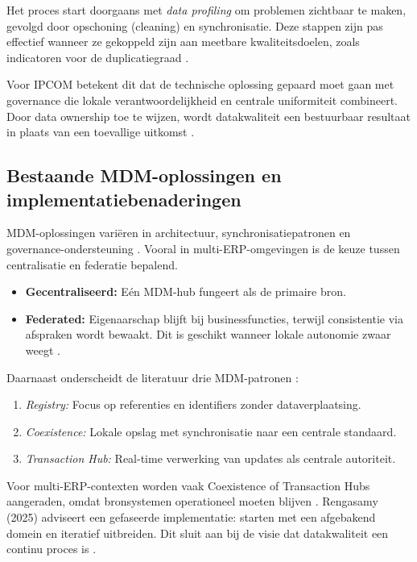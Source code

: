 Het proces start doorgaans met \emph{data profiling} om problemen zichtbaar te maken, gevolgd door opschoning (cleaning) en synchronisatie. Deze stappen zijn pas effectief wanneer ze gekoppeld zijn aan meetbare kwaliteitsdoelen, zoals indicatoren voor de duplicatiegraad \autocite{Hikmawati}.

Voor IPCOM betekent dit dat de technische oplossing gepaard moet gaan met governance die lokale verantwoordelijkheid en centrale uniformiteit combineert. Door data ownership toe te wijzen, wordt datakwaliteit een bestuurbaar resultaat in plaats van een toevallige uitkomst \autocite{VilminkoHeikkinenPekkola2019}.

\subsection{Bestaande MDM-oplossingen en implementatiebenaderingen}
MDM-oplossingen variëren in architectuur, synchronisatiepatronen en governance-ondersteuning \autocite{Rengasamy2025}. Vooral in multi-ERP-omgevingen is de keuze tussen centralisatie en federatie bepalend.



\begin{itemize}
    \item \textbf{Gecentraliseerd:} Eén MDM-hub fungeert als de primaire bron.
    \item \textbf{Federated:} Eigenaarschap blijft bij businessfuncties, terwijl consistentie via afspraken wordt bewaakt. Dit is geschikt wanneer lokale autonomie zwaar weegt \autocite{Rengasamy2025}.
\end{itemize}

Daarnaast onderscheidt de literatuur drie MDM-patronen \autocite{Rengasamy2025}:
\begin{enumerate}
    \item \emph{Registry:} Focus op referenties en identifiers zonder dataverplaatsing.
    \item \emph{Coexistence:} Lokale opslag met synchronisatie naar een centrale standaard.
    \item \emph{Transaction Hub:} Real-time verwerking van updates als centrale autoriteit.
\end{enumerate}

Voor multi-ERP-contexten worden vaak Coexistence of Transaction Hubs aangeraden, omdat bronsystemen operationeel moeten blijven \autocite{Maedche2010}. Rengasamy (2025) adviseert een gefaseerde implementatie: starten met een afgebakend domein en iteratief uitbreiden. Dit sluit aan bij de visie dat datakwaliteit een continu proces is \autocite{Hikmawati}.

